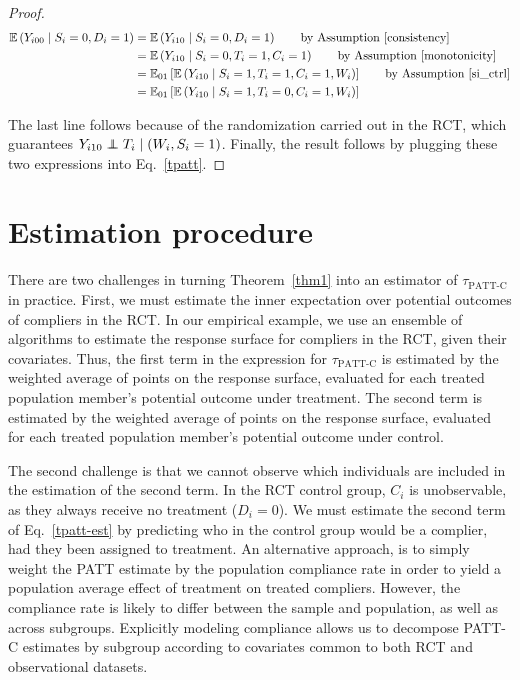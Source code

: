 \documentclass[hidelinks,12pt]{article}
\newcommand{\ex}{\mathbb{E}} %
\newcommand\independent{\protect\mathpalette{\protect\independenT}{\perp}}
\def\independenT#1#2{\mathrel{\rlap{$#1#2$}\mkern2mu{#1#2}}}
\begin{document}
{\begin{proof}
\begin{align*}
\ex\left(Y_{i00} \mid S_i=0, D_i=1\right) &= \ex\left(Y_{i10} \mid S_i=0, D_i=1\right) \tag*{by Assumption \ref{consistency}} \\
&= \ex\left(Y_{i10} \mid S_i=0, T_i=1, C_i=1\right) \tag*{by Assumption \ref{monotonicity}} \\
&= \ex_{01}\left[  \ex\left(Y_{i10} \mid S_i=1, T_i=1, C_i=1, W_i\right) \right] \tag*{by Assumption \ref{si_ctrl}} \\
&= \ex_{01}\left[  \ex\left(Y_{i10} \mid S_i=1, T_i=0, C_i=1, W_i\right) \right] \\
\end{align*}

The last line follows because of the randomization carried out in the RCT, which guarantees $Y_{i10} \independent T_i \mid (W_i, S_i=1)$. Finally, the result follows by plugging these two expressions into Eq.~\eqref{tpatt}.
\end{proof}

\section{Estimation procedure}\label{estimation}
There are two challenges in turning Theorem~\ref{thm1} into an estimator of $\tau_{\text{PATT-C}}$ in practice. First, we must estimate the inner expectation over potential outcomes of compliers in the RCT. In our empirical example, we use an ensemble of algorithms \citep{van2007} to estimate the response surface for compliers in the RCT, given their covariates. Thus, the first term in the expression for $\tau_{\text{PATT-C}}$ is estimated by the weighted average of points on the response surface, evaluated for each treated population member's potential outcome under treatment. The second term is estimated by the weighted average of points on the response surface, evaluated for each treated population member's potential outcome under control.

The second challenge is that we cannot observe which individuals are included in the estimation of the second term. In the RCT control group, $C_i$ is unobservable, as they always receive no treatment ($D_i=0$). We must estimate the second term of Eq.~\eqref{tpatt-est} by predicting who in the control group would be a complier, had they been assigned to treatment. {\color{red}An alternative approach, is to simply weight the PATT estimate by the population compliance rate in order to yield a population average effect of treatment on treated compliers. However, the compliance rate is likely to differ between the sample and population, as well as across subgroups. Explicitly modeling compliance allows us to decompose PATT-C estimates by subgroup according to covariates common to both RCT and observational datasets.}

}
\end{document}
